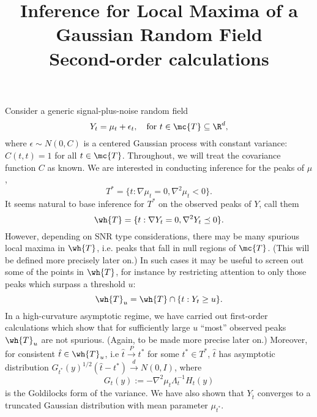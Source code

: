 \documentclass{article}
\title{ {\bf Inference for Local Maxima of a Gaussian Random Field} \\ Second-order calculations}
\begin{document}
	
	\maketitle
	\RaggedRight
	
	Consider a generic signal-plus-noise random field
	\begin{equation}
		\label{eqn:signal-plus-noise}
		Y_t = \mu_t + \epsilon_t, \quad {\rm for} ~ t \in \mc{T} \subseteq \R^d,
	\end{equation}
	where $\epsilon \sim N(0,C)$ is a centered Gaussian process with constant variance: $C(t,t) = 1$ for all $t \in \mc{T}$. Throughout, we will treat the covariance function $C$ as known. We are interested in conducting inference for the peaks of $\mu$,
	\begin{equation}
		\label{eqn:true-peaks}
		T^* = \{t: \nabla \mu_t = 0, \nabla^2 \mu_t < 0\}.
	\end{equation}
	It seems natural to base inference for $T^*$ on the observed peaks of $Y$, call them
	\begin{equation}
		\label{eqn:observed-peaks}
		\wh{T} = \{t: \nabla Y_t = 0, \nabla^2 Y_t \preceq 0\}.
	\end{equation}
	However, depending on SNR type considerations, there may be many spurious local maxima in $\wh{T}$, i.e. peaks that fall in null regions of $\mc{T}$. (This will be defined more precisely later on.) In such cases it may be useful to screen out some of the points in $\wh{T}$, for instance by restricting attention to only those peaks which surpass a threshold $u$:
	\begin{equation}
		\label{eqn:observed-peaks}
		\wh{T}_u = \wh{T} \cap \{t: Y_t \geq u\}.
	\end{equation}
	In a high-curvature asymptotic regime, we have carried out first-order calculations which show that for sufficiently large $u$ ``most'' observed peaks $\wh{T}_u$ are not spurious. (Again, to be made more precise later on.) Moreover, for consistent $\hat{t} \in \wh{T}_u$, i.e $\hat{t} \overset{P}{\to} t^*$ for some $t^{*} \in T^*$, $\hat{t}$ has asymptotic distribution
	$G_{t^*}(y)^{1/2}(\hat{t} - t^*) \overset{d}{\to} N(0, I)$, where
	\begin{equation}
		\label{eqn:goldilocks}
		G_{t}(y) := -\nabla^2 \mu_{t} \Lambda_t^{-1} H_t(y)
	\end{equation}
	is the Goldilocks form of the variance. We have also shown that $Y_{\hat{t}}$ converges to a truncated Gaussian distribution with mean parameter $\mu_{t^*}$.
	
\end{document}
